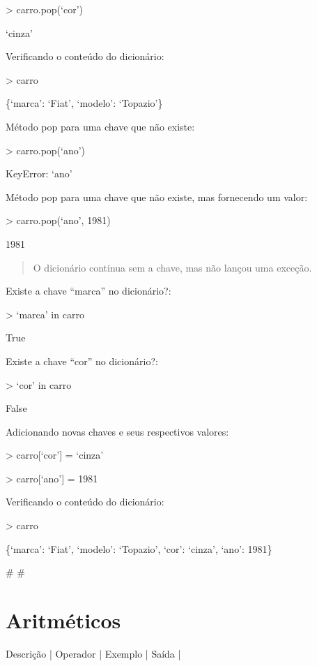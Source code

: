 \documentclass[letterpaper,10pt,brazil]{sphinxmanual}
\begin{document}
\textgreater{} carro.pop(‘cor’)

‘cinza’

Verificando o conteúdo do dicionário:

\textgreater{} carro

\{‘marca’: ‘Fiat’, ‘modelo’: ‘Topazio’\}

Método pop para uma chave que não existe:

\textgreater{} carro.pop(‘ano’)

KeyError: ‘ano’

Método pop para uma chave que não existe, mas fornecendo um valor:

\textgreater{} carro.pop(‘ano’, 1981)

1981
\begin{quote}

O dicionário continua sem a chave, mas não lançou uma exceção.
\end{quote}

Existe a chave “marca” no dicionário?:

\textgreater{} ‘marca’ in carro

True

Existe a chave “cor” no dicionário?:

\textgreater{} ‘cor’ in carro

False

Adicionando novas chaves e seus respectivos valores:

\textgreater{} carro{[}‘cor’{]} = ‘cinza’

\textgreater{} carro{[}‘ano’{]} = 1981

Verificando o conteúdo do dicionário:

\textgreater{} carro

\{‘marca’: ‘Fiat’, ‘modelo’: ‘Topazio’, ‘cor’: ‘cinza’, ‘ano’: 1981\}

\# 
\# 


\chapter{Aritméticos}
\label{\detokenize{content/operators:aritmeticos}}\label{\detokenize{content/operators::doc}}
\begin{DUlineblock}{0em}
\item[] Descrição       | Operador | Exemplo | Saída |
\end{DUlineblock}
\end{document}
